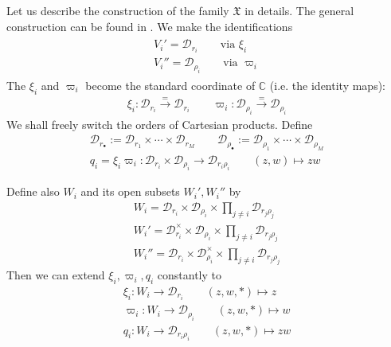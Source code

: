 \documentclass[11pt,b5paper,notitlepage]{article}
\theoremstyle{definition}
\theoremstyle{plain}
\newcommand{\mc}{\mathcal}
\newcommand{\wht}{\widehat}
\newcommand{\blt}{\bullet}
\newcommand{\Cbb}{\mathbb C}
\newcommand{\<}{\left\langle}
\renewcommand{\>}{\right\rangle}
\newcommand{\fx}{\mathfrak{X}}
\newcommand{\MD}{\mathcal{D}}
\numberwithin{equation}{section}
\begin{document}
Let us describe the construction of the family $\fx$ in details. The general construction can be found in \cite[Sec. 3]{Gui-sewingconvergence}. We make the identifications
\begin{gather}\label{eq22}
\begin{gathered}
V_i'=\mc D_{r_i}\qquad \text{via }\xi_i\\
V_i''=\mc D_{\rho_i}\qquad \text{via }\varpi_i
\end{gathered}
\end{gather}
The $\xi_i$ and $\varpi_i$ become  the standard coordinate of $\Cbb$ (i.e. the identity maps):
\begin{gather*}
\xi_i:\mc D_{r_i}\xrightarrow{=}\mc D_{r_i}\qquad \varpi_i:\mc D_{\rho_i}\xrightarrow{=}\mc D_{\rho_i}
\end{gather*}
We shall freely switch the orders of Cartesian products. Define 
\begin{gather*}
    \MD_{r_\blt}:=\MD_{r_1}\times \cdots \times \MD_{r_M}\qquad\MD_{\rho_\blt}:=\MD_{\rho_1}\times \cdots \times \MD_{\rho_M}\\
q_i=\xi_i\varpi_i:\MD_{r_i}\times \MD_{\rho_i}\rightarrow \MD_{r_i\rho_i}\qquad (z,w)\mapsto zw
\end{gather*}
\begin{comment}
Clearly, for each $1\leq i\leq R$, $q_{\blt\backslash i}:=(q_1,\cdots, \wht{q_{i}},\cdots ,q_R)$ is a coordinate of
\begin{align*}
  q_{\blt\backslash i}:=(q_1,\cdots, \wht{q_{i}},\cdots ,q_R)  \prod_{j\ne i} \MD_{r_j\rho_j}\rightarrow 
\end{align*}
for each $1\leq i\leq R$. 
\end{comment}
Define also $W_i$ and its open subsets $W_i',W_i''$ by
\begin{subequations}\label{eq44}
\begin{gather}
W_i=\MD_{r_i}\times\MD_{\rho_i}\times \prod_{j\ne i} \MD_{r_j\rho_j}\\
W_i'=\MD_{r_i}^\times \times \MD_{\rho_i}\times \prod_{j\ne i} \MD_{r_j\rho_j}\\
W_i''=\MD_{r_i} \times \MD_{\rho_i}^\times\times \prod_{j\ne i} \MD_{r_j\rho_j}
\end{gather}
\end{subequations}
Then we can extend $\xi_i,\varpi_i,q_i$ constantly to 
\begin{subequations}\label{eq29}
\begin{gather}
    \xi_i:W_i\rightarrow \MD_{r_i}  \qquad (z,w,*)\mapsto z\\
    \varpi_i:W_i\rightarrow \MD_{\rho_i}\qquad (z,w,*)\mapsto w\\
q_i:W_i\rightarrow \MD_{r_i\rho_i} \qquad (z,w,*)\mapsto zw
\end{gather}
\end{subequations}
\end{document}
